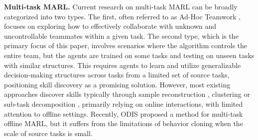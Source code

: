 \textbf{Multi-task MARL.} 
Current research on multi-task MARL can be broadly categorized into two types. The first, often referred to as Ad-Hoc Teamwork \cite{stone2010ad, zhang2023fast}, focuses on exploring how to effectively collaborate with unknown and uncontrollable teammates within a given task. The second type, which is the primary focus of this paper, involves scenarios where the algorithm controls the entire team, but the agents are trained on some tasks and testing on unseen tasks with similar structures. This requires agents to learn and utilize generalizable decision-making structures across tasks from a limited set of source tasks, positioning skill discovery as a promising solution. However, most existing approaches discover skills typically through sample reconstruction \cite{wang2020rode,hsl2022,HMASD}, clustering \cite{LI2025106852} or sub-task decomposition \cite{tian2024decompose}, primarily relying on online interactions, with limited attention to offline settings. Recently, ODIS \cite{zhang2023odis} proposed a method for multi-task offline MARL, but it suffers from the limitations of behavior cloning when the scale of source tasks is small.